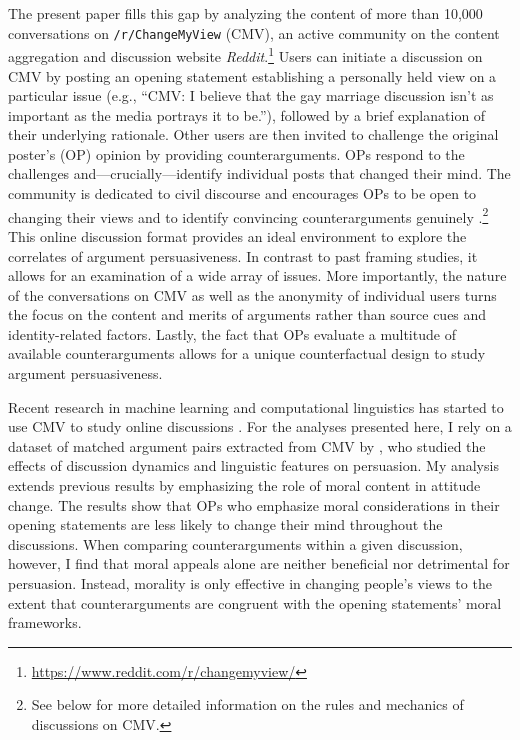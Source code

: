 The present paper fills this gap by analyzing the content of more than 10,000 conversations on \texttt{/r/ChangeMyView} (CMV), an active community on the content aggregation and discussion website \textit{Reddit}.\footnote{\url{https://www.reddit.com/r/changemyview/}} Users can initiate a discussion on CMV by posting an opening statement establishing a personally held view on a particular issue (e.g., ``CMV: I believe that the gay marriage discussion isn't as important as the media portrays it to be.''), followed by a brief explanation of their underlying rationale. Other users are then invited to challenge the original poster's (OP) opinion by providing counterarguments. OPs respond to the challenges and---crucially---identify individual posts that changed their mind. The community is dedicated to civil discourse and encourages OPs to be open to changing their views and to identify convincing counterarguments genuinely \citep[e.g.,][]{jhaver2017designing}.\footnote{See below for more detailed information on the rules and mechanics of discussions on CMV.} This online discussion format provides an ideal environment to explore the correlates of argument persuasiveness. In contrast to past framing studies, it allows for an examination of a wide array of issues. More importantly, the nature of the conversations on CMV as well as the anonymity of individual users turns the focus on the content and merits of arguments rather than source cues and identity-related factors. Lastly, the fact that OPs evaluate a multitude of available counterarguments allows for a unique counterfactual design to study argument persuasiveness.

Recent research in machine learning and computational linguistics has started to use CMV to study online discussions \citep{wei2016post,hidey2017analyzing}. For the analyses presented here, I rely on a dataset of matched argument pairs extracted from CMV by \citet{tan2016winning}, who studied the effects of discussion dynamics and linguistic features on persuasion. My analysis extends previous results by emphasizing the role of moral content in attitude change. The results show that OPs who emphasize moral considerations in their opening statements are less likely to change their mind throughout the discussions. When comparing counterarguments within a given discussion, however, I find that moral appeals alone are neither beneficial nor detrimental for persuasion. Instead, morality is only effective in changing people's views to the extent that counterarguments are congruent with the opening statements' moral frameworks.

